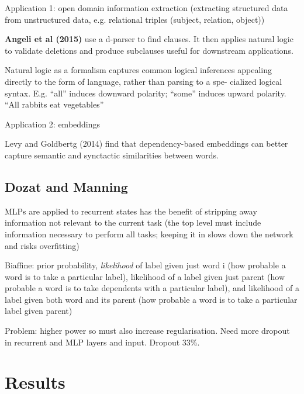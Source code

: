 \documentclass{report}
\theoremstyle{definition}
\theoremstyle{plain}
\theoremstyle{definition}
\theoremstyle{remark}
\numberwithin{equation}{section}
\numberwithin{figure}{section}
\numberwithin{table}{section}
\begin{document}
\setcounter{secnumdepth}{3}

Application 1: open domain information extraction (extracting structured data from unstructured data, e.g. relational triples (subject, relation, object))

\textbf{Angeli et al (2015)} use a d-{}parser to find clauses. It then applies natural logic to validate deletions and produce subclauses useful for downstream applications.

Natural logic as a formalism captures common logical inferences appealing directly to the form of language, rather than parsing to a spe-{} cialized logical syntax. E.g. \enquote{all} induces downward polarity; \enquote{some} induces upward polarity. \enquote{All rabbits eat vegetables}

Application 2: embeddings

Levy and Goldbertg (2014) find that dependency-{}based embeddings can better capture semantic and synctactic similarities between words.

\subsection{Dozat and Manning}

MLPs are applied to recurrent states has the benefit of stripping away information not relevant to the current task (the top level must include information necessary to perform all tasks; keeping it in slows down the network and risks overfitting)

Biaffine: prior probability, \emph{likelihood} of label given just word i (how probable a word is to take a particular label), likelihood of a label given just parent (how probable a word is to take dependents with a particular label), and likelihood of a label given both word and its parent (how probable a word is to take a particular label given parent)

Problem: higher power so must also increase regularisation. Need more dropout in recurrent and MLP layers and input. Dropout 33\%.

\section{Results}
\end{document}
